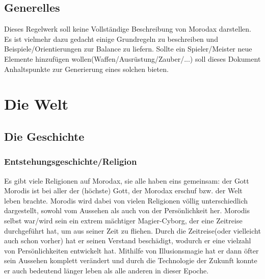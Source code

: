 \raggedright
\chapter{Generelles}
Dieses Regelwerk soll keine Vollständige Beschreibung von Morodax darstellen. Es ist vielmehr dazu gedacht einige Grundregeln zu beschreiben  und Beispiele/Orientierungen zur Balance zu liefern. Sollte ein Spieler/Meister neue Elemente hinzufügen wollen(Waffen/Ausrüstung/Zauber/...) soll dieses Dokument Anhaltspunkte zur Generierung eines solchen bieten.

\part{Die Welt}
\chapter{Die Geschichte}
\section{Entstehungsgeschichte/Religion}
Es gibt viele Religionen auf Morodax, sie alle haben eins gemeinsam: der Gott Morodis ist bei aller der (höchste) Gott, der Morodax erschuf bzw. der Welt leben brachte. Morodis wird dabei von vielen Religionen völlig unterschiedlich dargestellt, sowohl vom Aussehen als auch  von der Persönlichkeit her. Morodis selbst war/wird sein ein extrem mächtiger Magier-Cyborg, der eine Zeitreise durchgeführt hat, um aus seiner Zeit zu fliehen. Durch die Zeitreise(oder vielleicht auch schon vorher) hat er seinen Verstand beschädigt, wodurch er eine vielzahl von Persönlichkeiten entwickelt hat. Mithilfe von Illusionsmagie hat er dann öfter sein Aussehen komplett verändert und durch die Technologie der Zukunft konnte er auch bedeutend länger leben als alle anderen in dieser Epoche.

